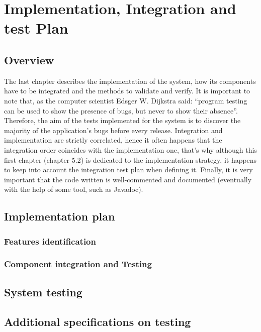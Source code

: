 \section{Implementation, Integration and test Plan}
\subsection{Overview}
The last chapter describes the implementation of the system, how its components have to be
integrated and the methods to validate and verify. It is important to note that, as the
computer scientist Edsger W. Dijkstra said: “program testing can be used to show the
presence of bugs, but never to show their absence”. Therefore, the aim of the tests
implemented for the system is to discover the majority of the application’s bugs before every
release. Integration and implementation are strictly correlated, hence it often happens that
the integration order coincides with the implementation one, that’s why although this first
chapter (chapter 5.2) is dedicated to the implementation strategy, it happens to keep into
account the integration test plan when defining it. Finally, it is very important that the code
written is well-commented and documented (eventually with the help of some tool, such as
Javadoc).
\subsection{Implementation plan}
\subsubsection{Features identification}
\subsubsection{Component integration and Testing}
\subsection{System testing}
\subsection{Additional specifications on testing}